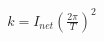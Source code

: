\documentclass[preview]{standalone}
\begin{document}
\begin{align*}
k = I_{net} (\frac{2\pi}{T})^2
\end{align*}
\end{document}
